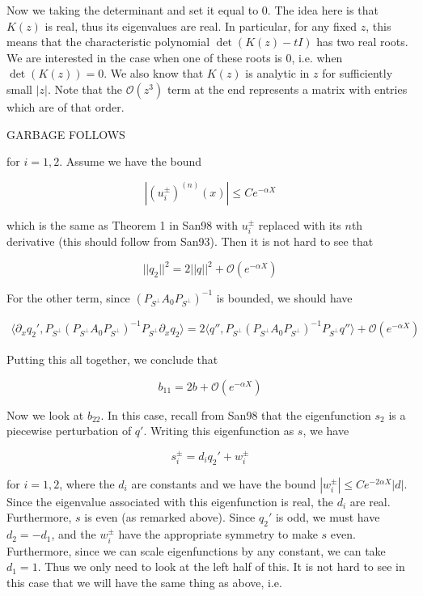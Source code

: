 \documentclass[12pt]{article}
\begin{document}
\begin{enumerate}
Now we taking the determinant and set it equal to 0. The idea here is that $K(z)$ is real, thus its eigenvalues are real. In particular, for any fixed $z$, this means that the characteristic polynomial $\det(K(z) - t I)$ has two real roots. We are interested in the case when one of these roots is 0, i.e. when $\det(K(z)) = 0$. We also know that $K(z)$ is analytic in $z$ for sufficiently small $|z|$. Note that the $\mathcal{O}(z^3)$ term at the end represents a matrix with entries which are of that order. 


\end{enumerate}

GARBAGE FOLLOWS

for $i = 1, 2$. Assume we have the bound

\[
|(u_i^\pm)^{(n)}(x)| \leq C e^{-\alpha X}
\] 

which is the same as Theorem 1 in San98 with $u_i^\pm$ replaced with its $n$th derivative (this should follow from San93). Then it is not hard to see that 

\[
||q_2||^2 = 2 ||q||^2 + \mathcal{O}(e^{-\alpha X})
\]

For the other term, since $(P_{S^\perp} A_0 P_{S^\perp})^{-1}$ is bounded, we should have

\begin{align*}
\langle \partial_x q_2', P_{S^\perp} (P_{S^\perp} A_0 P_{S^\perp})^{-1} P_{S^\perp} \partial_x q_2 \rangle 
= 2 \langle q'', P_{S^\perp} (P_{S^\perp} A_0 P_{S^\perp})^{-1} P_{S^\perp} q'' \rangle + \mathcal{O}(e^{-\alpha X})
\end{align*}

Putting this all together, we conclude that 

\[
b_{11} = 2b + \mathcal{O}(e^{-\alpha X})
\]

Now we look at $b_{22}$. In this case, recall from San98 that the eigenfunction $s_2$ is a piecewise perturbation of $q'$. Writing this eigenfunction as $s$, we have

\[
s_i^\pm = d_i q_2' + w_i^\pm
\]

for $i = 1, 2$, where the $d_i$ are constants and we have the bound $|w_i^\pm| \leq C e^{-2 \alpha X}|d|$. Since the eigenvalue associated with this eigenfunction is real, the $d_i$ are real. Furthermore, $s$ is even (as remarked above). Since $q_2'$ is odd, we must have $d_2 = -d_1$, and the $w_i^\pm$ have the appropriate symmetry to make $s$ even. Furthermore, since we can scale eigenfunctions by any constant, we can take $d_1 = 1$. Thus we only need to look at the left half of this. It is not hard to see in this case that we will have the same thing as above, i.e. 
\end{document}
